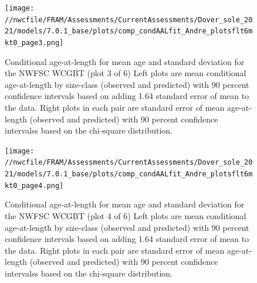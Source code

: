 \documentclass[11pt,
  english,
  a4paper,
]{article}
\begin{document}
\begin{figure}
\centering
\texttt{[image: //nwcfile/FRAM/Assessments/CurrentAssessments/Dover\_sole\_2021/models/7.0.1\_base/plots/comp\_condAALfit\_Andre\_plotsflt6mkt0\_page3.png]}
\caption{Conditional age-at-length for mean age and standard deviation for the NWFSC WCGBT (plot 3 of 6) Left plots are mean conditional age-at-length by size-class (observed and predicted) with 90 percent confidence intervals based on adding 1.64 standard error of mean to the data. Right plots in each pair are standard error of mean age-at-length (observed and predicted) with 90 percent confidence intervalss based on the chi-square distribution.\label{fig:wcgbt-caal-fit-3}}
\end{figure}

\tagmcend\tagstructend


\begin{figure}
\centering
\texttt{[image: //nwcfile/FRAM/Assessments/CurrentAssessments/Dover\_sole\_2021/models/7.0.1\_base/plots/comp\_condAALfit\_Andre\_plotsflt6mkt0\_page4.png]}
\caption{Conditional age-at-length for mean age and standard deviation for the NWFSC WCGBT (plot 4 of 6) Left plots are mean conditional age-at-length by size-class (observed and predicted) with 90 percent confidence intervals based on adding 1.64 standard error of mean to the data. Right plots in each pair are standard error of mean age-at-length (observed and predicted) with 90 percent confidence intervalss based on the chi-square distribution.\label{fig:wcgbt-caal-fit-4}}
\end{figure}

\tagmcend\tagstructend

\end{document}
